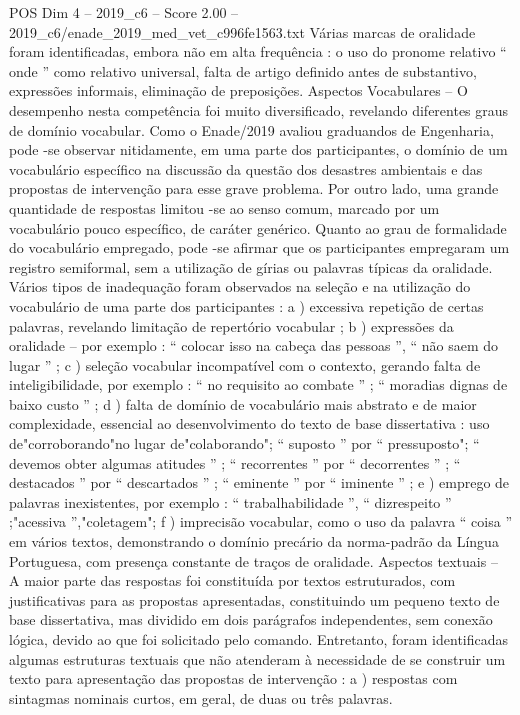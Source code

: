 \begin{textsample}{POS Dim 4 – 2019\_c6 – Score 2.00 – 2019\_c6/enade\_2019\_med\_vet\_c996fe1563.txt}
Várias marcas de oralidade foram identificadas, embora não em alta frequência : o uso do pronome relativo “ onde ” como relativo universal, falta de artigo definido antes de substantivo, expressões informais, eliminação de preposições.
Aspectos Vocabulares – O desempenho nesta competência foi muito diversificado, revelando diferentes graus de domínio vocabular.
Como o Enade/2019 avaliou graduandos de Engenharia, pode -se observar nitidamente, em uma parte dos participantes, o domínio de um vocabulário específico na discussão da questão dos desastres ambientais e das propostas de intervenção para esse grave problema.
Por outro lado, uma grande quantidade de respostas limitou -se ao senso comum, marcado por um vocabulário pouco específico, de caráter genérico.
Quanto ao grau de formalidade do vocabulário empregado, pode -se afirmar que os participantes empregaram um registro semiformal, sem a utilização de gírias ou palavras típicas da oralidade.
Vários tipos de inadequação foram observados na seleção e na utilização do vocabulário de uma parte dos participantes : a ) excessiva repetição de certas palavras, revelando limitação de repertório vocabular ; b ) expressões da oralidade – por exemplo : “ colocar isso na cabeça das pessoas ”, “ não saem do lugar ” ; c ) seleção vocabular incompatível com o contexto, gerando falta de inteligibilidade, por exemplo : “ no requisito ao combate ” ; “ moradias dignas de baixo custo ” ; d ) falta de domínio de vocabulário mais abstrato e de maior complexidade, essencial ao desenvolvimento do texto de base dissertativa : uso de"corroborando"no lugar de"colaborando"; “ suposto ” por “ pressuposto"; “ devemos obter algumas atitudes ” ; “ recorrentes ” por “ decorrentes ” ; “ destacados ” por “ descartados ” ; “ eminente ” por “ iminente ” ; e ) emprego de palavras inexistentes, por exemplo : “ trabalhabilidade ”, “ dizrespeito ” ;"acessiva ”,"coletagem"; f ) imprecisão vocabular, como o uso da palavra “ coisa ” em vários textos, demonstrando o domínio precário da norma-padrão da Língua Portuguesa, com presença constante de traços de oralidade.
Aspectos textuais – A maior parte das respostas foi constituída por textos estruturados, com justificativas para as propostas apresentadas, constituindo um pequeno texto de base dissertativa, mas dividido em dois parágrafos independentes, sem conexão lógica, devido ao que foi solicitado pelo comando.
Entretanto, foram identificadas algumas estruturas textuais que não atenderam à necessidade de se construir um texto para apresentação das propostas de intervenção : a ) respostas com sintagmas nominais curtos, em geral, de duas ou três palavras.

\end{textsample}
